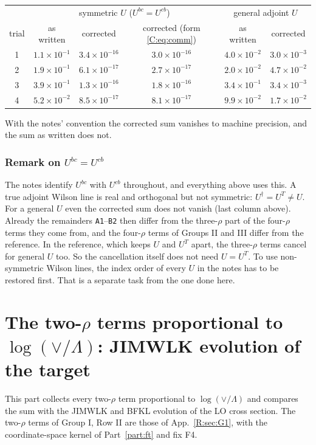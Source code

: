 \documentclass[10pt]{article}
\numberwithin{equation}{section}
\newcommand{\lab}[1]{\texttt{#1}}
\begin{document}
\begin{center}\small
\begin{tabular}{@{}c c c c c c@{}}
& \multicolumn{3}{c}{symmetric $U$ ($U^{bc}=U^{cb}$)} & \multicolumn{2}{c}{general adjoint $U$}\\
trial & as written & corrected & corrected (form \eqref{C:eq:comm}) & as written & corrected\\ \hline
1 & $1.1\times10^{-1}$ & $3.4\times10^{-16}$ & $3.0\times10^{-16}$ & $4.0\times10^{-2}$ & $3.0\times10^{-3}$\\
2 & $1.9\times10^{-1}$ & $6.1\times10^{-17}$ & $2.7\times10^{-17}$ & $2.0\times10^{-2}$ & $4.7\times10^{-2}$\\
3 & $3.9\times10^{-1}$ & $1.3\times10^{-16}$ & $1.8\times10^{-16}$ & $3.4\times10^{-1}$ & $3.4\times10^{-3}$\\
4 & $5.2\times10^{-2}$ & $8.5\times10^{-17}$ & $8.1\times10^{-17}$ & $9.9\times10^{-2}$ & $1.7\times10^{-2}$\\
\end{tabular}
\end{center}
With the notes' convention the corrected sum vanishes to machine precision, and the sum as written does not.


\section{Remark on \texorpdfstring{$U^{bc}=U^{cb}$}{U symmetric}}\label{C:sec:Usym}

The notes identify $U^{bc}$ with $U^{cb}$ throughout, and everything above uses this. A true adjoint Wilson line is real and orthogonal but not symmetric: $U^{\dagger}=U^T\neq U$. For a general $U$ even the corrected sum does not vanish (last column above). Already the remainders \lab{A1}--\lab{B2} then differ from the three-$\rho$ part of the four-$\rho$ terms they come from, and the four-$\rho$ terms of Groups II and III differ from the reference. In the reference, which keeps $U$ and $U^T$ apart, the three-$\rho$ terms cancel for general $U$ too. So the cancellation itself does not need $U=U^T$. To use non-symmetric Wilson lines, the index order of every $U$ in the notes has to be restored first. That is a separate task from the one done here.




\part{The two-\texorpdfstring{$\rho$}{rho} terms proportional to \texorpdfstring{$\log(\vee/\Lambda)$}{log(vee/Lambda)}: JIMWLK evolution of the target}\label{part:jimwlk}
This part collects every two-$\rho$ term proportional to $\log(\vee/\Lambda)$ and compares the sum with the JIMWLK and BFKL evolution of the LO cross section. The two-$\rho$ terms of Group I, Row II are those of App.~\ref{R:sec:G1}, with the coordinate-space kernel of Part~\ref{part:ft} and fix F4.
\end{document}
